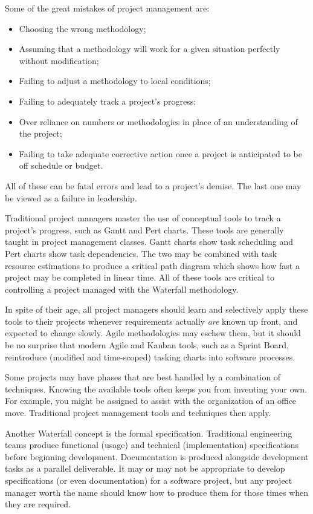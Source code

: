 Some of the great mistakes of project management are:
\begin{itemize}
\item Choosing the wrong methodology;
\item Assuming that a methodology will work for a given
        situation perfectly without modification;
\item Failing to adjust a methodology to local conditions;
\item Failing to adequately track a project's progress;
\item Over reliance on numbers or methodologies in place of
        an understanding of the project;
\item Failing to take adequate corrective action once a
        project is anticipated to be off schedule or budget.
\end{itemize}

All of these can be fatal errors and lead to a project's demise.  The last one may be viewed as a failure in leadership.

Traditional project managers master the use of conceptual tools to track a project's progress, such as Gantt and Pert charts.  These tools are generally taught in project management classes.  Gantt charts show task scheduling and Pert charts show task dependencies.  The two may be combined with task resource estimations to produce a critical path diagram which shows how fast a project may be completed in linear time.  All of these tools are critical to controlling a project managed with the Waterfall methodology.

In spite of their age, all project managers should learn and selectively apply these tools to their projects whenever requirements actually \textit{are} known up front, and expected to change slowly. Agile methodologies may eschew them, but it should be no surprise that modern Agile and Kanban tools, such as a Sprint Board, reintroduce (modified and time-scoped) tasking charts into software processes.

Some projects may have phases that are best handled by a combination of techniques. Knowing the available tools often keeps you from inventing your own. For example, you might be assigned to assist with the organization of an office move. Traditional project management tools and techniques then apply.

Another Waterfall concept is the formal specification. Traditional engineering teams produce functional (usage) and technical (implementation) specifications before beginning development.  Documentation is produced alongside development tasks as a parallel deliverable.  It may or may not be appropriate to develop specifications (or even documentation) for a software project, but any project manager worth the name should know how to produce them for those times when they are required.

